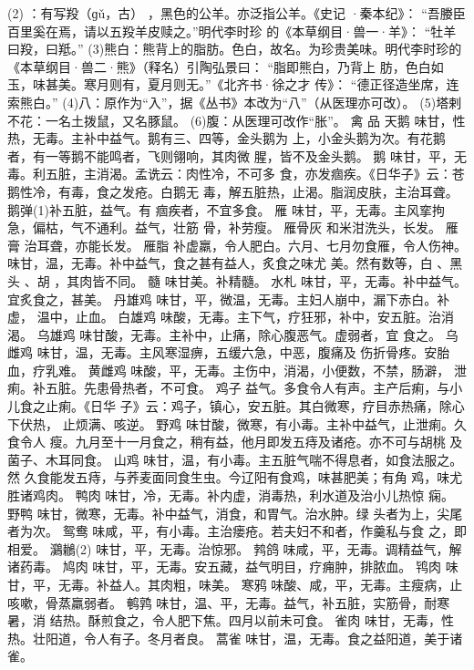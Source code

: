 \documentclass[12pt,UTF8]{ctexbook}
\begin{document}
(2) ：有写羖（ɡǔ，古） ，黑色的公羊。亦泛指公羊。《史记
·秦本纪》：
“吾媵臣百里奚在焉，请以五羖羊皮赎之。”明代李时珍
的《本草纲目·兽一·羊》：
“牡羊曰羖，曰羝。”
(3)熊白：熊背上的脂肪。色白，故名。为珍贵美味。明代李时珍的
《本草纲目·兽二·熊》（释名）引陶弘景曰：
“脂即熊白，乃背上
肪，色白如玉，味甚美。寒月则有，夏月则无。”《北齐书·徐之才
传》：
“德正径造坐席，连索熊白。”
(4)八：原作为“入”，据《丛书》本改为“八”（从医理亦可改）。
(5)塔剌不花：一名土拨鼠，又名豚鼠。
(6)腹：从医理可改作“胀”。
禽 品
天鹅 味甘，性热，无毒。主补中益气。鹅有三、四等，金头鹅为
上，小金头鹅为次。有花鹅者，有一等鹅不能鸣者，飞则翎响，其肉微
腥，皆不及金头鹅。
鹅 味甘，平，无毒。利五脏，主消渴。孟诜云：肉性冷，不可多
食，亦发痼疾。《日华子》云：苍鹅性冷，有毒，食之发疮。白鹅无
毒，解五脏热，止渴。脂润皮肤，主治耳聋。鹅弹(1)补五脏，益气。有
痼疾者，不宜多食。
雁 味甘，平，无毒。主风挛拘急，偏枯，气不通利。益气，壮筋
骨，补劳瘦。
雁骨灰 和米泔洗头，长发。
雁膏 治耳聋，亦能长发。
雁脂 补虚羸，令人肥白。六月、七月勿食雁，令人伤神。
味甘，温，无毒。补中益气，食之甚有益人，炙食之味尤
美。然有数等，白 、黑头 、胡 ，其肉皆不同。
髓 味甘美。补精髓。
水札 味甘，平，无毒。补中益气。宜炙食之，甚美。
丹雄鸡 味甘，平，微温，无毒。主妇人崩中，漏下赤白。补虚，
温中，止血。
白雄鸡 味酸，无毒。主下气，疗狂邪，补中，安五脏。治消渴。
乌雄鸡 味甘酸，无毒。主补中，止痛，除心腹恶气。虚弱者，宜
食之。
乌雌鸡 味甘，温，无毒。主风寒湿痹，五缓六急，中恶，腹痛及
伤折骨疼。安胎血，疗乳难。
黄雌鸡 味酸，平，无毒。主伤中，消渴，小便数，不禁，肠澼，
泄痢。补五脏。先患骨热者，不可食。
鸡子 益气。多食令人有声。主产后痢，与小儿食之止痢。《日华
子》云：鸡子，镇心，安五脏。其白微寒，疗目赤热痛，除心下伏热，
止烦满、咳逆。
野鸡 味甘酸，微寒，有小毒。主补中益气，止泄痢。久食令人
瘦。九月至十一月食之，稍有益，他月即发五痔及诸疮。亦不可与胡桃
及菌子、木耳同食。
山鸡 味甘，温，有小毒。主五脏气喘不得息者，如食法服之。然
久食能发五痔，与荞麦面同食生虫。今辽阳有食鸡，味甚肥美；有角
鸡，味尤胜诸鸡肉。
鸭肉 味甘，冷，无毒。补内虚，消毒热，利水道及治小儿热惊
痫。
野鸭 味甘，微寒，无毒。补中益气，消食，和胃气。治水肿。绿
头者为上，尖尾者为次。
鸳鸯 味咸，平，有小毒。主治瘘疮。若夫妇不和者，作羹私与食
之，即相爱。
鸂鶒(2) 味甘，平，无毒。治惊邪。
鹁鸽 味咸，平，无毒。调精益气，解诸药毒。
鸠肉 味甘，平，无毒。安五藏，益气明目，疗痈肿，排脓血。
鸨肉 味甘，平，无毒。补益人。其肉粗，味美。
寒鸦 味酸、咸，平，无毒。主瘦病，止咳嗽，骨蒸羸弱者。
鹌鹑 味甘，温、平，无毒。益气，补五脏，实筋骨，耐寒暑，消
结热。酥煎食之，令人肥下焦。四月以前未可食。
雀肉 味甘，无毒，性热。壮阳道，令人有子。冬月者良。
蒿雀 味甘，温，无毒。食之益阳道，美于诸雀。
\end{document}
